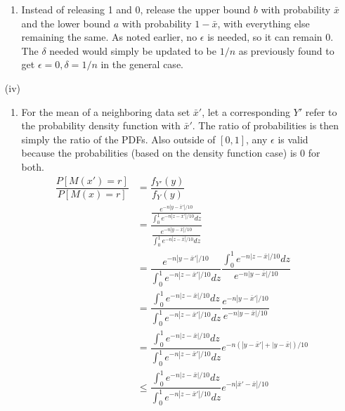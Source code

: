 \documentclass[12pt]{article}
\begin{document}
\begin{enumerate}
\begin{enumerate}
	\item Instead of releasing 1 and 0, release the upper bound $b$ with probability $\bar{x}$ and the lower bound $a$ with probability $1-\bar{x}$, with everything else remaining the same. As noted earlier, no $\epsilon$ is needed, so it can remain 0. The $\delta$ needed would simply be updated to be $1/n$ as previously found to get $\boxed{\epsilon=0, \delta=1/n}$ in the general case.
	\end{enumerate}
	\item[(iv)] \begin{enumerate}
	\item For the mean of a neighboring data set $\bar{x}'$, let a corresponding $Y'$ refer to the probability density function with $\bar{x}'$. The ratio of probabilities is then simply the ratio of the PDFs. Also outside of $[0, 1]$, any $\epsilon$ is valid because the probabilities (based on the density function case) is 0 for both.
	\begin{align*}
		\dfrac{P[M(x') = r]}{P[M(x)=r]} &= \dfrac{f_{Y'}(y)}{f_Y(y)}\\
		&= \dfrac{\frac{e^{-n|y-\bar{x}'|/10}}{\int_0^1 e^{-n|z-\bar{x}'|/10} dz}}{\frac{e^{-n|y-\bar{x}|/10}}{\int_0^1 e^{-n|z-\bar{x}|/10} dz}}\\
		&= \dfrac{e^{-n|y-\bar{x}'|/10}}{\int_0^1 e^{-n|z-\bar{x}'|/10} dz}\dfrac{\int_0^1 e^{-n|z-\bar{x}|/10} dz}{e^{-n|y-\bar{x}|/10}}\\
		&= \dfrac{\int_0^1 e^{-n|z-\bar{x}|/10} dz}{\int_0^1 e^{-n|z-\bar{x}'|/10} dz}\dfrac{e^{-n|y-\bar{x}'|/10}}{e^{-n|y-\bar{x}|/10}}\\
		&= \dfrac{\int_0^1 e^{-n|z-\bar{x}|/10} dz}{\int_0^1 e^{-n|z-\bar{x}'|/10} dz}e^{-n(|y-\bar{x}'|+|y-\bar{x}|)/10}\\
		&\leq \dfrac{\int_0^1 e^{-n|z-\bar{x}|/10} dz}{\int_0^1 e^{-n|z-\bar{x}'|/10} dz}e^{-n|\bar{x}'-\bar{x}|/10}
	\end{align*}

\end{enumerate}
\end{enumerate}
\end{document}
